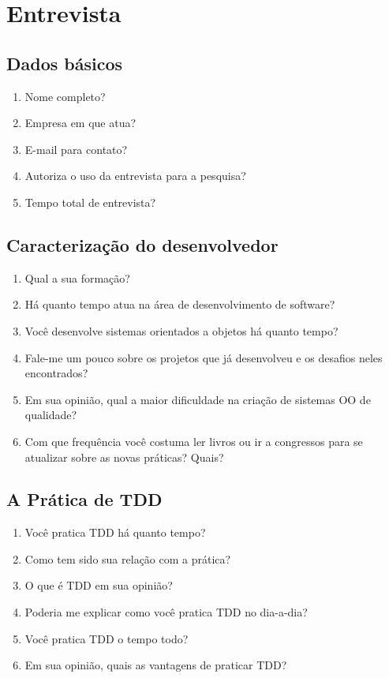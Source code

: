 \chapter{Entrevista}
\label{ape:entrevista}

\section{Dados básicos}

\begin{enumerate}
	\item Nome completo?
	\item Empresa em que atua?
	\item E-mail para contato?
	\item Autoriza o uso da entrevista para a pesquisa?
	\item Tempo total de entrevista?
\end{enumerate}

\section{Caracterização do desenvolvedor}

\begin{enumerate}
	\item Qual a sua formação?
	\item Há quanto tempo atua na área de desenvolvimento de software?
	\item Você desenvolve sistemas orientados a objetos há quanto tempo?	
	\item Fale-me um pouco sobre os projetos que já desenvolveu e os desafios neles encontrados?
	\item Em sua opinião, qual a maior dificuldade na criação de sistemas OO de qualidade?
	\item Com que frequência você costuma ler livros ou ir a congressos para se atualizar sobre as novas práticas? Quais?
\end{enumerate}

\section{A Prática de TDD}

\begin{enumerate}
	\item Você pratica TDD há quanto tempo?
	\item Como tem sido sua relação com a prática?
	\item O que é TDD em sua opinião?
	\item Poderia me explicar como você pratica TDD no dia-a-dia?
	\item Você pratica TDD o tempo todo?
	\item Em sua opinião, quais as vantagens de praticar TDD?
\end{enumerate}

